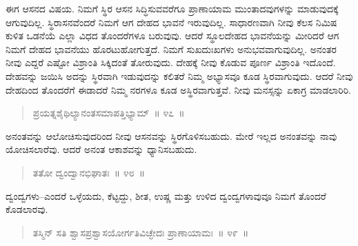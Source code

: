 
\vspace{0.1cm}

ಈಗ ಆಸನದ ವಿಷಯ. ನಿಮಗೆ ಸ್ಥಿರ ಆಸನ ಸಿದ್ಧಿಸುವವರೆಗೂ ಪ್ರಾಣಾಯಾಮ ಮುಂತಾದವುಗಳನ್ನು ಮಾಡುವುದಕ್ಕೆ ಆಗುವುದಿಲ್ಲ. ಸ್ಥಿರಾಸನವೆಂದರೆ ನಿಮಗೆ ಆಗ ದೇಹದ ಭಾವನೆ ಇರುವುದಿಲ್ಲ. ಸಾಧಾರಣವಾಗಿ ನೀವು ಕೆಲಸ ನಿಮಿಷ ಕುಳಿತ ಒಡನೆಯೆ ಎಲ್ಲಾ ವಿಧದ ತೊಂದರೆಗಳೂ ಬರುವುವು. ಆದರೆ ಸ್ಥೂಲದೇಹದ ಭಾವನೆಯನ್ನು ಮೀರಿದರೆ ಆಗ ನಿಮಗೆ ದೇಹದ ಭಾವನೆಯು ಹೊರಟುಹೋಗುತ್ತದೆ. ನಿಮಗೆ ಸುಖದುಃಖಗಳು ಅನುಭವವಾಗುವುದಿಲ್ಲ. ಅನಂತರ ನೀವು ಎದ್ದರೆ ಎಷ್ಟೋ ವಿಶ್ರಾಂತಿ ಸಿಕ್ಕಿದಂತೆ ತೋರುವುದು. ದೇಹಕ್ಕೆ ನೀವು ಕೊಡುವ ಪೂರ್ಣ ವಿಶ್ರಾಂತಿ ಇದೊಂದೆ. ದೇಹವನ್ನು ಜಯಿಸಿ ಅದನ್ನು ಸ್ಥಿರವಾಗಿ ಇಡುವುದನ್ನು ಕಲಿತರೆ ನಿಮ್ಮ ಅಭ್ಯಾಸವೂ ಕೂಡ ಸ್ಥಿರವಾಗುವುದು. ಆದರೆ ನೀವು ದೇಹದಿಂದ ತೊಂದರೆಗೆ ಈಡಾದರೆ ನಿಮ್ಮ ನರಗಳೂ ಕೂಡ ಅಸ್ಥಿರವಾಗುತ್ತವೆ. ನೀವು ಮನಸ್ಸನ್ನು ಏಕಾಗ್ರ ಮಾಡಲಾರಿರಿ. 

\vspace{-0.2cm}

\begin{verse}
ಪ್ರಯತ್ನಶೈಥಿಲ್ಯಾನಂತಸಮಾಪತ್ತಿಭ್ಯಾಮ್​~॥ ೪೭~॥
\end{verse}

\vspace{-0.35cm}


\vspace{0.1cm}

ಅನಂತವನ್ನು ಆಲೋಚಿಸುವುದರಿಂದ ನೀವು ಆಸನವನ್ನು ಸ್ಥಿರಗೊಳಿಸಬಹುದು. ಮೇರೆ ಇಲ್ಲದ ಅನಂತವನ್ನು ನಾವು ಯೋಚಿಸಲಾರೆವು. ಆದರೆ ಅನಂತ ಆಕಾಶವನ್ನು ಧ್ಯಾನಿಸಬಹುದು. 

\vspace{-0.2cm}

\begin{verse}
ತತೋ ದ್ವಂದ್ವಾನಭಿಘಾತಃ~॥ ೪೮~॥
\end{verse}

\vspace{-0.35cm}


\vspace{0.1cm}

ದ್ವಂದ್ವಗಳು–ಎಂದರೆ ಒಳ್ಳೆಯದು, ಕೆಟ್ಟದ್ದು, ಶೀತ, ಉಷ್ಣ ಮತ್ತು ಉಳಿದ ದ್ವಂದ್ವಗಳಾವುವೂ ನಿಮಗೆ ತೊಂದರೆ ಕೊಡಲಾರವು. 

\vspace{-0.2cm}

\begin{verse}
ತಸ್ಮಿನ್​ ಸತಿ ಶ್ವಾಸಪ್ರಶ್ವಾಸಯೋರ್ಗತಿವಿಚ್ಛೇದಃ ಪ್ರಾಣಾಯಾಮಃ~॥ ೪೯~॥
\end{verse}

